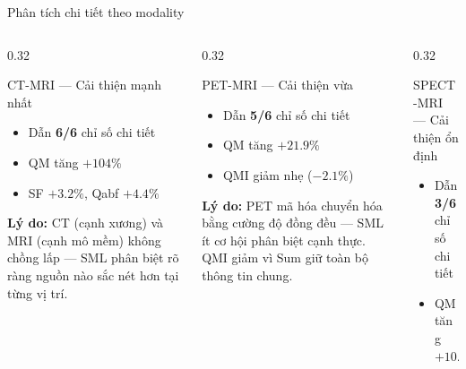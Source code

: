 \documentclass[t, aspectratio=169]{beamer}
\begin{document}
\begin{frame}{Phân tích chi tiết theo modality}
    \begin{columns}[T]
        \begin{column}{0.32\textwidth}
            \begin{block}{\small CT-MRI --- Cải thiện mạnh nhất}
                \small
                \begin{itemize}\itemsep1pt
                    \item Dẫn \textbf{6/6} chỉ số chi tiết
                    \item QM tăng \textbf{$+104\%$}
                    \item SF $+3.2\%$, Qabf $+4.4\%$
                \end{itemize}
                \vspace{0.3em}
                \textbf{Lý do:} CT (cạnh xương) và MRI (cạnh mô mềm) không chồng lấp --- SML phân biệt rõ ràng nguồn nào sắc nét hơn tại từng vị trí.
            \end{block}
        \end{column}
        \begin{column}{0.32\textwidth}
            \begin{block}{\small PET-MRI --- Cải thiện vừa}
                \small
                \begin{itemize}\itemsep1pt
                    \item Dẫn \textbf{5/6} chỉ số chi tiết
                    \item QM tăng \textbf{$+21.9\%$}
                    \item QMI giảm nhẹ ($-2.1\%$)
                \end{itemize}
                \vspace{0.3em}
                \textbf{Lý do:} PET mã hóa chuyển hóa bằng cường độ đồng đều --- SML ít cơ hội phân biệt cạnh thực. QMI giảm vì Sum giữ toàn bộ thông tin chung.
            \end{block}
        \end{column}
        \begin{column}{0.32\textwidth}
            \begin{block}{\small SPECT-MRI --- Cải thiện ổn định}
                \small
                \begin{itemize}\itemsep1pt
                    \item Dẫn \textbf{3/6} chỉ số chi tiết
                    \item QM tăng \textbf{$+10.4\%$}

\end{itemize}
\end{block}
\end{column}
\end{columns}
\end{frame}
\end{document}
